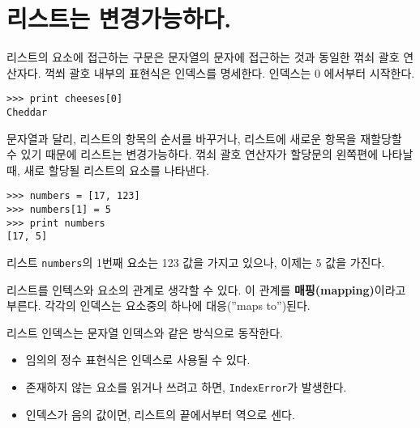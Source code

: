
\section{리스트는 변경가능하다.}


리스트의 요소에 접근하는 구문은 문자열의 문자에 접근하는 것과 동일한 꺾쇠 괄호 연산자다.
꺽쐬 괄호 내부의 표현식은 인덱스를 명세한다. 인덱스는 0 에서부터 시작한다.

\beforeverb
\begin{verbatim}
>>> print cheeses[0]
Cheddar
\end{verbatim}
\afterverb
%

문자열과 달리, 리스트의 항목의 순서를 바꾸거나, 리스트에 새로운 항목을 재할당할 수 있기 때문에 리스트는 변경가능하다.
꺾쇠 괄호 연산자가 할당문의 왼쪽편에 나타날 때, 새로 할당될 리스트의 요소를 나타낸다.


\beforeverb
\begin{verbatim}
>>> numbers = [17, 123]
>>> numbers[1] = 5
>>> print numbers
[17, 5]
\end{verbatim}
\afterverb
%

리스트 {\tt numbers}의 1번째 요소는 123 값을 가지고 있으나, 이제는 5 값을 가진다.


리스트를 인텍스와 요소의 관계로 생각할 수 있다. 이 관계를 {\bf 매핑(mapping)}이라고 부른다. 각각의 인덱스는 요소중의 하나에 대응(''maps to'')된다.


리스트 인덱스는 문자열 인덱스와 같은 방식으로 동작한다.

\begin{itemize}

\item 임의의 정수 표현식은 인덱스로 사용될 수 있다.

\item 존재하지 않는 요소를 읽거나 쓰려고 하면, {\tt IndexError}가 발생한다.


\item 인덱스가 음의 값이면, 리스트의 끝에서부터 역으로 센다.

\end{itemize}

